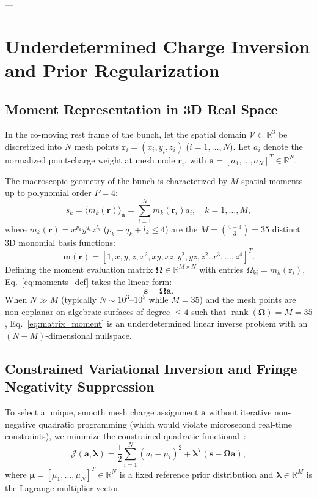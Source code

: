 \documentclass[11pt,a4paper]{article}
\newcommand{\bOmega}{\mathbf{\Omega}}
\begin{document}
---

\section{Underdetermined Charge Inversion and Prior Regularization}

\subsection{Moment Representation in 3D Real Space}
In the co-moving rest frame of the bunch, let the spatial domain $\mathcal{V} \subset \mathbb{R}^3$ be discretized into $N$ mesh points $\bm{r}_i = (x_i, y_i, z_i)$ ($i = 1, \dots, N$). Let $a_i$ denote the normalized point-charge weight at mesh node $\bm{r}_i$, with $\bm{a} = [a_1, \dots, a_N]^T \in \mathbb{R}^N$.

The macroscopic geometry of the bunch is characterized by $M$ spatial moments up to polynomial order $P=4$:
\begin{equation}
    s_k = \langle m_k(\bm{r}) \rangle_{\bm{a}} = \sum_{i=1}^N m_k(\bm{r}_i) a_i, \quad k = 1, \dots, M,
    \label{eq:moments_def}
\end{equation}
where $m_k(\bm{r}) = x^{p_k} y^{q_k} z^{l_k}$ ($p_k + q_k + l_k \le 4$) are the $M = \binom{4+3}{3} = 35$ distinct 3D monomial basis functions:
\begin{equation}
    \bm{m}(\bm{r}) = \left[ 1, x, y, z, x^2, xy, xz, y^2, yz, z^2, x^3, \dots, z^4 \right]^T.
\end{equation}
Defining the moment evaluation matrix $\bOmega \in \mathbb{R}^{M \times N}$ with entries $\Omega_{ki} = m_k(\bm{r}_i)$, Eq.~\eqref{eq:moments_def} takes the linear form:
\begin{equation}
    \bm{s} = \bOmega \bm{a}.
    \label{eq:matrix_moment}
\end{equation}
When $N \gg M$ (typically $N \sim 10^3\text{--}10^5$ while $M = 35$) and the mesh points are non-coplanar on algebraic surfaces of degree $\le 4$ such that $\operatorname{rank}(\bOmega) = M = 35$, Eq.~\eqref{eq:matrix_moment} is an underdetermined linear inverse problem with an $(N - M)$-dimensional nullspace.

\subsection{Constrained Variational Inversion and Fringe Negativity Suppression}
To select a unique, smooth mesh charge assignment $\bm{a}$ without iterative non-negative quadratic programming (which would violate microsecond real-time constraints), we minimize the constrained quadratic functional~\cite{ahn1994preliminary}:
\begin{equation}
    \mathcal{J}(\bm{a}, \bm{\lambda}) = \frac{1}{2} \sum_{i=1}^N (a_i - \mu_i)^2 + \bm{\lambda}^T (\bm{s} - \bOmega \bm{a}),
    \label{eq:lagrangian_func}
\end{equation}
where $\bm{\mu} = [\mu_1, \dots, \mu_N]^T \in \mathbb{R}^N$ is a fixed reference prior distribution and $\bm{\lambda} \in \mathbb{R}^M$ is the Lagrange multiplier vector.
\end{document}
